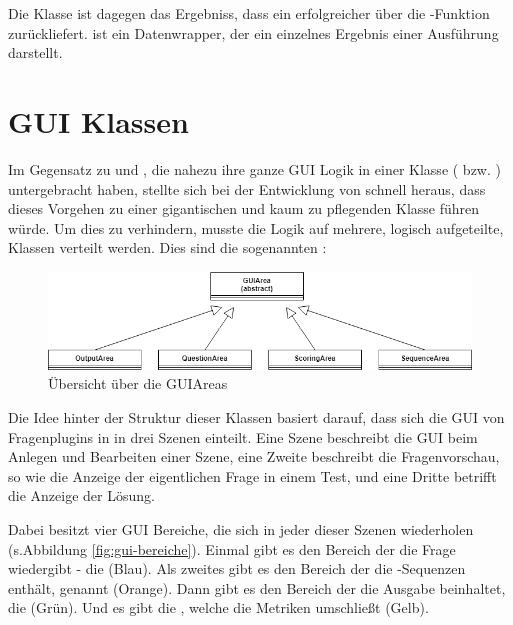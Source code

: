 Die Klasse  ist dagegen das Ergebniss, dass ein erfolgreicher  über die -Funktion zurückliefert.  ist ein Datenwrapper, der ein einzelnes Ergebnis einer Ausführung darstellt.

\section{GUI Klassen}
\label{sec:gui-klassen}

Im Gegensatz zu  und , die nahezu ihre ganze GUI Logik in einer Klasse ( bzw. )  untergebracht haben, stellte sich bei der Entwicklung von  schnell heraus, dass dieses Vorgehen zu einer gigantischen und kaum zu pflegenden Klasse führen würde. Um dies zu verhindern, musste die Logik auf mehrere, logisch aufgeteilte, Klassen verteilt werden. Dies sind die sogenannten :

    \begin{figure}[H]
        \begin{center}
            \includegraphics[page=1, width=0.7\paperwidth, trim=0 0 0 0, clip]{fig/GUIArea.png} 
            \caption{Übersicht über die GUIAreas}
            \label{fig:sql-run}
        \end{center}
    \end{figure}

Die Idee hinter der Struktur dieser Klassen basiert darauf, dass sich die GUI von Fragenplugins in  in drei Szenen einteilt. Eine Szene beschreibt die GUI beim Anlegen und Bearbeiten einer Szene, eine Zweite beschreibt die Fragenvorschau, so wie die Anzeige der eigentlichen Frage in einem Test, und eine Dritte betrifft die Anzeige der Lösung.

Dabei besitzt  vier GUI Bereiche, die sich in jeder dieser Szenen wiederholen (s.Abbildung \ref{fig:gui-bereiche}). Einmal gibt es den Bereich der die Frage wiedergibt - die  (Blau). Als zweites gibt es den Bereich der die -Sequenzen enthält, genannt  (Orange). Dann gibt es den Bereich der die Ausgabe beinhaltet, die   (Grün). Und es gibt die , welche die Metriken umschließt (Gelb).  

